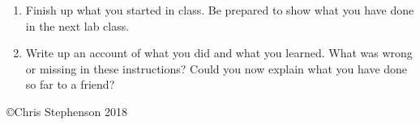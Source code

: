 \documentclass[12pt,a4paper]{article}
\begin{document}

\begin{enumerate}
\item Finish up what you started in class. Be prepared to show what you have done in the next lab class. 
\item Write up an account of what you did and what you learned. What was wrong or missing in these instructions? Could you now explain what you have done so far to a friend?


\end{enumerate}

\copyright Chris Stephenson 2018
\end{document}
